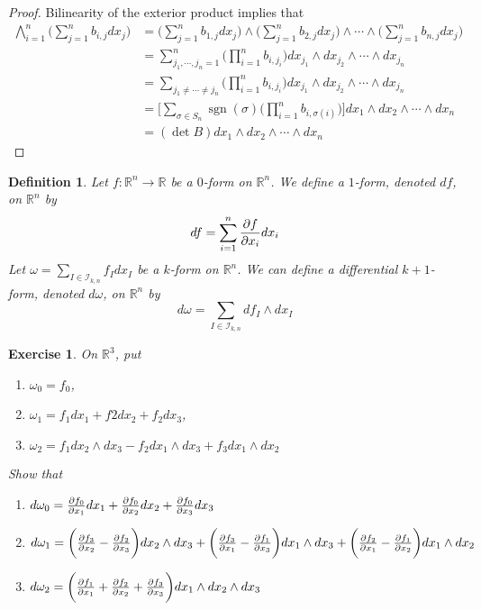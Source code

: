 \documentclass[12pt]{amsart}
\newtheorem{defn}[thm]{Definition}
\newtheorem{ex}[thm]{Exercise}
\newcommand{\sig}{\sigma}
\newcommand{\om}{\omega}
\newcommand{\R}{\mathbb{R}}
\newcommand{\MI}{\mathcal{I}}
\DeclareMathOperator{\sgn}{sgn}
\begin{document}
	\begin{proof}
		Bilinearity of the exterior product implies that
		\begin{align*}
			\bigwedge_{i=1}^n \bigg(\sum_{j=1}^n b_{i,j}dx_j\bigg)
			 &=\bigg(\sum_{j=1}^n b_{1,j}dx_j\bigg) \wedge \bigg(\sum_{j=1}^n b_{2,j}dx_j\bigg) \wedge \cdots \wedge \bigg(\sum_{j=1}^n b_{n,j}dx_j\bigg) \\
			 &= \sum_{j_1, \cdots, j_n = 1}^n \bigg( \prod_{i=1}^n b_{i, j_i} \bigg) dx_{j_1}\wedge  dx_{j_2} \wedge \cdots \wedge  dx_{j_n} \\
			 &= \sum_{j_1 \neq \cdots \neq j_n} \bigg( \prod_{i=1}^n b_{i, j_i} \bigg) dx_{j_1}\wedge  dx_{j_2} \wedge \cdots \wedge  dx_{j_n} \\
			 &= \bigg[ \sum_{\sig \in S_n} \sgn(\sig) \bigg(\prod_{i=1}^n b_{i, \sig(i)} \bigg) \bigg] dx_{1}\wedge  dx_{2} \wedge \cdots \wedge  dx_{n} \\
			 &= (\det B) dx_{1}\wedge  dx_{2} \wedge \cdots \wedge  dx_{n}
		\end{align*} 
		
	\end{proof}

	\begin{defn}
		Let $f: \R^n \rightarrow \R$ be a $0$-form on $\R^n$. We define a $1$-form, denoted $df$, on $\R^n$ by $$df = \sum_{i = 1}^n \pdv{f}{x_i} dx_i$$
		Let $\om = \sum\limits_{I \in \MI_{k,n}} f_Idx_I$ be a $k$-form on $\R^n$. We can define a differential $k+1$-form, denoted $d \om$, on $\R^n$ by $$d\om = \sum\limits_{I \in \MI_{k,n}} df_I\wedge dx_I$$  
	\end{defn}

	\begin{ex}
		On $\R^3$, put 
		\begin{enumerate}
			\item $\om_0 = f_0$, 
			\item $\om_1 = f_1 dx_1 + f2 dx_2 + f_2 dx_3$, 
			\item $\om_2 = f_1dx_2\wedge dx_3 - f_2 dx_1 \wedge dx_3 + f_3 dx_1 \wedge dx_2$
		\end{enumerate} 
		Show that
		\begin{enumerate}
			\item $d\om_0 = \pdv{f_0}{x_1}dx_1 + \pdv{f_0}{x_2}dx_2 + \pdv{f_0}{x_3}dx_3$
			\item $d \om_1 = \bigg(\pdv{f_3}{x_2} - \pdv{f_2}{x_3} \bigg) dx_2 \wedge dx_3 + \bigg( \pdv{f_3}{x_1} - \pdv{f_1}{x_3}\bigg)dx_1 \wedge dx_3 + \bigg( \pdv{f_2}{x_1} - \pdv{f_1}{x_2} \bigg) dx_1 \wedge dx_2$
			\item $d \om_2 = \bigg( \pdv{f_1}{x_1} + \pdv{f_2}{x_2} + \pdv{f_3}{x_3} \bigg) dx_1 \wedge dx_2 \wedge dx_3$ 
		\end{enumerate}
	\end{ex}
\end{document}
